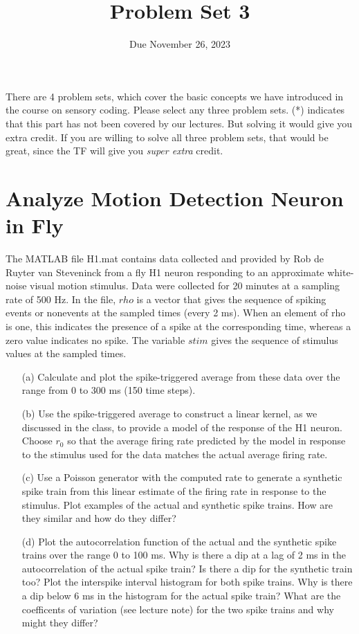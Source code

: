 \documentclass{article}
\title{Problem Set 3}
\date{Due November 26, 2023}
\begin{document}
\maketitle


There are 4 problem sets, which cover the basic concepts we have introduced in the course on sensory coding. Please select any three problem sets.  (*) indicates that this part has not been covered by our lectures. But solving it would give you extra credit.  If you are willing to solve all three problem sets, that would be great, since the TF will give you \textit{super extra} credit.


\section*{Analyze Motion Detection Neuron in Fly}

The MATLAB file H1.mat contains data collected and provided by Rob de Ruyter van Steveninck from a fly H1 neuron responding to an approximate white-noise visual motion stimulus. Data were collected for 20 minutes at a sampling rate of 500 Hz. In the file, $rho$ is a vector that gives the sequence of spiking events or nonevents at the sampled times (every 2 ms). When an element of rho is one, this indicates the presence of a spike at the corresponding time, whereas a zero value indicates no spike. The variable $stim$ gives the sequence of stimulus values at the sampled times. 
\begin{enumerate}
\item[(a)] Calculate and plot the spike-triggered average from these data over the range from 0 to 300 ms (150 time steps).

\item[(b)] Use the spike-triggered average to construct a linear kernel, as we discussed in the class, to provide a model of the response of the H1 neuron. Choose $r_0$ so that the average firing rate predicted by the model in response to the stimulus used
for the data matches the actual average firing rate. 

\item[(c)] Use a Poisson generator with the computed rate to generate a synthetic spike train from this linear estimate of the firing rate in response to the stimulus. Plot examples of the actual and synthetic spike trains. How
are they similar and how do they differ? 

\item[(d)]Plot the autocorrelation function of the actual and the synthetic spike trains over the range 0 to 100 ms. Why is there a dip at a lag of 2 ms in the autocorrelation of the actual spike train? Is there a dip for the synthetic train too? Plot the interspike interval histogram for both spike trains. Why is there a dip below 6 ms in the histogram for the actual spike train? What are the coefficents of variation (see lecture note) for the two spike trains and why might they differ? 

\end{enumerate}
 
\end{document}
